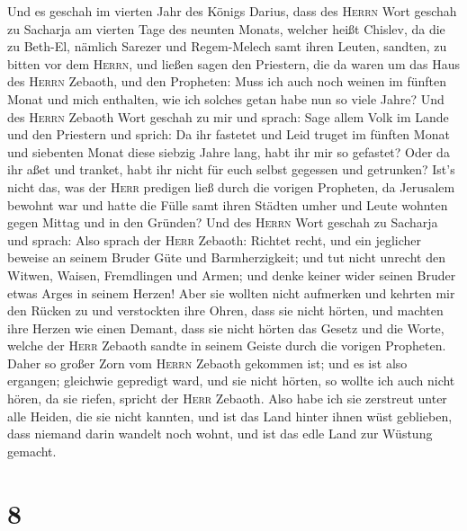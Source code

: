 Und es geschah im vierten Jahr des Königs Darius, dass
des \textsc{Herrn} Wort geschah zu Sacharja am vierten Tage des neunten
Monats, welcher heißt Chislev,  da die zu Beth-El, nämlich
Sarezer und Regem-Melech samt ihren Leuten, sandten, zu bitten vor dem
\textsc{Herrn},  und ließen sagen den Priestern, die da
waren um das Haus des \textsc{Herrn} Zebaoth, und den Propheten: Muss
ich auch noch weinen im fünften Monat und mich enthalten, wie ich
solches getan habe nun so viele Jahre?  Und des
\textsc{Herrn} Zebaoth Wort geschah zu mir und sprach: 
Sage allem Volk im Lande und den Priestern und sprich: Da ihr fastetet
und Leid truget im fünften Monat und siebenten Monat diese siebzig Jahre
lang, habt ihr mir so gefastet?  Oder da ihr aßet und
tranket, habt ihr nicht für euch selbst gegessen und getrunken?
 Ist's nicht das, was der \textsc{Herr} predigen ließ
durch die vorigen Propheten, da Jerusalem bewohnt war und hatte die
Fülle samt ihren Städten umher und Leute wohnten gegen Mittag und in den
Gründen?  Und des \textsc{Herrn} Wort geschah zu Sacharja
und sprach:  Also sprach der \textsc{Herr} Zebaoth:
Richtet recht, und ein jeglicher beweise an seinem Bruder Güte und
Barmherzigkeit;  und tut nicht unrecht den Witwen,
Waisen, Fremdlingen und Armen; und denke keiner wider seinen Bruder
etwas Arges in seinem Herzen!  Aber sie wollten nicht
aufmerken und kehrten mir den Rücken zu und verstockten ihre Ohren, dass
sie nicht hörten,  und machten ihre Herzen wie einen
Demant, dass sie nicht hörten das Gesetz und die Worte, welche der
\textsc{Herr} Zebaoth sandte in seinem Geiste durch die vorigen
Propheten. Daher so großer Zorn vom \textsc{Herrn} Zebaoth gekommen ist;
 und es ist also ergangen; gleichwie gepredigt ward, und
sie nicht hörten, so wollte ich auch nicht hören, da sie riefen, spricht
der \textsc{Herr} Zebaoth.  Also habe ich sie zerstreut
unter alle Heiden, die sie nicht kannten, und ist das Land hinter ihnen
wüst geblieben, dass niemand darin wandelt noch wohnt, und ist das edle
Land zur Wüstung gemacht.

\hypertarget{section-7}{%
\section{8}\label{section-7}}

